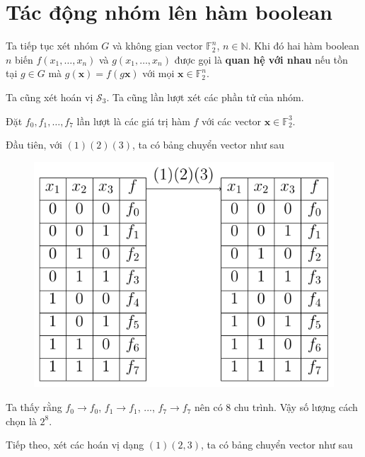 \documentclass{mynotes}
\newcommand{\FF}{\mathbb{F}}
\newcommand{\NN}{\mathbb{N}}
\begin{document}
\section{Tác động nhóm lên hàm boolean}

Ta tiếp tục xét nhóm $G$ và không gian vector $\FF_2^n$, $n \in \NN$. Khi đó hai hàm boolean $n$ biến $f(x_1, \ldots, x_n)$ và $g(x_1, \ldots, x_n)$ được gọi là \textbf{quan hệ với nhau} nếu tồn tại $g \in G$ mà $g(\bm{x}) = f(g \bm{x})$ với mọi $\bm{x} \in \FF_2^n$.

Ta cũng xét hoán vị $\mathcal{S}_3$. Ta cũng lần lượt xét các phần tử của nhóm.

Đặt $f_0, f_1, \ldots, f_7$ lần lượt là các giá trị hàm $f$ với các vector $\bm{x} \in \FF_2^3$.

Đầu tiên, với $(1)(2)(3)$, ta có bảng chuyển vector như sau

\begin{figure}[ht]
    \centering
    \includegraphics{./mynotes-figures/bool1.pdf}
\end{figure}

Ta thấy rằng $f_0 \to f_0$, $f_1 \to f_1$, ..., $f_7 \to f_7$ nên có 8 chu trình. Vậy số lượng cách chọn là $2^8$.

Tiếp theo, xét các hoán vị dạng $(1)(2, 3)$, ta có bảng chuyển vector như sau
\end{document}
